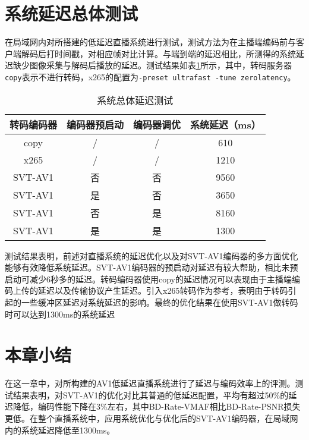 \section{系统延迟总体测试}
	在局域网内对所搭建的低延迟直播系统进行测试，测试方法为在主播端编码前与客户端解码后打时间戳，对相应帧对比计算。与端到端的延迟相比，所测得的系统延迟缺少图像采集与解码后播放的延迟。测试结果如表\ref{tab:sys-lat}所示，其中，转码服务器\texttt{copy}表示不进行转码，x265的配置为\texttt{-preset ultrafast -tune zerolatency}。%
  \begin{table}[H]
		\caption{系统总体延迟测试}
		\label{tab:sys-lat}
		\centering
		\begin{tabular}{cccc}
			\toprule
			 转码编码器  & 编码器预启动 & 编码器调优 & 系统延迟（ms） \\ \midrule
			 copy   &   /    &   /   &   610    \\
			 x265   &   /    &   /   &   1210   \\
			SVT-AV1 &   否    &   否   &   9560   \\
			SVT-AV1 &   是    &   否   &   3650   \\
			SVT-AV1 &   否    &   是   &   8160   \\
			SVT-AV1 &   是    &   是   &   1300   \\ \bottomrule
		\end{tabular}
	\end{table}

	测试结果表明，前述对直播系统的延迟优化以及对SVT-AV1编码器的多方面优化能够有效降低系统延迟。SVT-AV1编码器的预启动对延迟有较大帮助，相比未预启动可减少6秒多的延迟。转码编码器使用copy的延迟情况可以表现由于主播端编码上传的延迟以及传输协议产生延迟。引入x265转码作为参考，表明由于转码引起的一些缓冲区延迟对系统延迟的影响。最终的优化结果在使用SVT-AV1做转码时可以达到1300ms的系统延迟
\section{本章小结}
在这一章中，对所构建的AV1低延迟直播系统进行了延迟与编码效率上的评测。测试结果表明，对SVT-AV1的优化对比其普通的低延迟配置，平均有超过50\%的延迟降低，编码性能下降在3\%左右，其中BD-Rate-VMAF相比BD-Rate-PSNR损失更低。在整个直播系统中，应用系统优化与优化后的SVT-AV1编码器，在局域网内的系统延迟降低至1300ms。